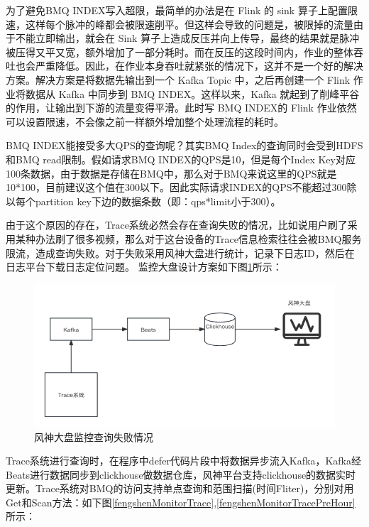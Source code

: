 \begin{longtable}[htbp]
为了避免BMQ INDEX写入超限，最简单的办法是在 Flink 的 sink 算子上配置限速，这样每个脉冲的峰都会被限速削平。但这样会导致的问题是，被限掉的流量由于不能立即输出，就会在 Sink 算子上造成反压并向上传导，最终的结果就是脉冲被压得又平又宽，额外增加了一部分耗时。而在反压的这段时间内，作业的整体吞吐也会严重降低。因此，在作业本身吞吐就紧张的情况下，这并不是一个好的解决方案。解决方案是将数据先输出到一个 Kafka Topic 中，之后再创建一个 Flink 作业将数据从 Kafka 中同步到 BMQ INDEX。这样以来，Kafka 就起到了削峰平谷的作用，让输出到下游的流量变得平滑。此时写 BMQ INDEX的 Flink 作业依然可以设置限速，不会像之前一样额外增加整个处理流程的耗时。

BMQ INDEX能接受多大QPS的查询呢？其实BMQ Index的查询同时会受到HDFS和BMQ read限制。假如请求BMQ INDEX的QPS是10，但是每个Index Key对应100条数据，由于数据是存储在BMQ中，那么对于BMQ来说这里的QPS就是10*100，目前建议这个值在300以下。因此实际请求INDEX的QPS不能超过300除以每个partition key下边的数据条数（即：qps*limit小于300）。

由于这个原因的存在，Trace系统必然会存在查询失败的情况，比如说用户刷了采用某种办法刷了很多视频，那么对于这台设备的Trace信息检索往往会被BMQ服务限流，造成查询失败。对于失败采用风神大盘进行统计，记录下日志ID，然后在日志平台下载日志定位问题。
监控大盘设计方案如下图\ref{fengshenMonitor}所示：

 \begin{figure}[htbp]
  \centering
  \includegraphics[width=5in]{figure/chapter6/风神大盘监控查询失败情况.png}
  \caption{风神大盘监控查询失败情况}\label{fengshenMonitor}
\end{figure}

Trace系统进行查询时，在程序中defer代码片段中将数据异步流入Kafka，Kafka经Beats进行数据同步到clickhouse做数据仓库，风神平台支持clickhouse的数据实时更新。Trace系统对BMQ的访问支持单点查询和范围扫描(时间Fliter)，分别对用Get和Scan方法：如下图\ref{fengshenMonitorTrace},\ref{fengshenMonitorTracePreHour}所示：


\end{longtable}
